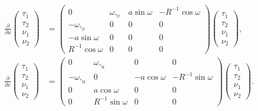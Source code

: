 \begin{equation}


\label{prlin}


\begin{split}


\frac{\partial}{\partial u} \begin{pmatrix}


\tau_1 \\ \tau_2 \\ \nu_1\\ \nu_2 \end{pmatrix} &=


\begin{pmatrix} 0 & \omega,_v & a \sin\omega & - R^{-1} \cos\omega \\


- \omega,_v & 0 & 0 & 0 \\ - a \sin\omega & 0 & 0 & 0 \\


R^{-1} \cos\omega & 0 & 0 & 0 \end{pmatrix}


\begin{pmatrix} \tau_1 \\ \tau_2 \\ \nu_1\\ \nu_2 \end{pmatrix},\\


%


\frac{\partial}{\partial v} \begin{pmatrix}


\tau_1 \\ \tau_2 \\ \nu_1\\ \nu_2 \end{pmatrix} &=


\begin{pmatrix} 0 & \omega,_u & 0 & 0 \\


- \omega,_u & 0 & -a \cos\omega & - R^{-1} \sin\omega \\ 


0 & a\cos\omega & 0 & 0 \\


0 & R^{-1} \sin\omega & 0 & 0 \end{pmatrix}


\begin{pmatrix} \tau_1 \\ \tau_2 \\ \nu_1\\ \nu_2 \end{pmatrix}.


\end{split}


\end{equation}


